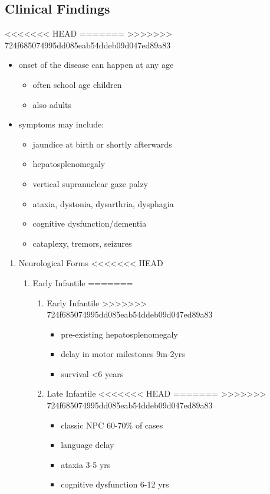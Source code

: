 \documentclass[fontsize=12pt]{scrartcl}
\begin{document}
\begin{enumerate}
\begin{enumerate}
\begin{enumerate}
\begin{enumerate}
\begin{table}[htbp]
\begin{enumerate}
\begin{enumerate}
\subsection{Clinical Findings}
<<<<<<< HEAD
\label{sec:org3ad2de8}
=======
\label{sec:orgf73529c}
>>>>>>> 724f685074995dd085eab54ddeb09d047ed89a83
\begin{itemize}
\item onset of the disease can happen at any age
\begin{itemize}
\item often school age children
\item also adults
\end{itemize}

\item symptoms may include:
\begin{itemize}
\item jaundice at birth or shortly afterwards
\item hepatosplenomegaly
\item vertical supranuclear gaze palzy
\item ataxia, dystonia, dysarthria, dysphagia
\item cognitive dysfunction/dementia
\item cataplexy, tremors, seizures
\end{itemize}
\end{itemize}

\begin{enumerate}
\item Neurological Forms
<<<<<<< HEAD
\label{sec:org31368a8}
\begin{enumerate}
\item Early Infantile
\label{sec:org70db7c8}
=======
\label{sec:org42f79cf}
\begin{enumerate}
\item Early Infantile
\label{sec:org40c10b2}
>>>>>>> 724f685074995dd085eab54ddeb09d047ed89a83
\begin{itemize}
\item pre-existing hepatosplenomegaly
\item delay in motor milestones 9m-2yrs
\item survival <6 years
\end{itemize}

\item Late Infantile
<<<<<<< HEAD
\label{sec:org2e442a2}
=======
\label{sec:org26e7876}
>>>>>>> 724f685074995dd085eab54ddeb09d047ed89a83
\begin{itemize}
\item classic NPC 60-70\% of cases
\item language delay
\item ataxia 3-5 yrs
\item cognitive dysfunction 6-12 yrs
\end{itemize}


\end{enumerate}
\end{enumerate}
\end{enumerate}
\end{enumerate}
\end{enumerate}
\end{table}
\end{enumerate}
\end{enumerate}
\end{enumerate}
\end{enumerate}
\end{document}
